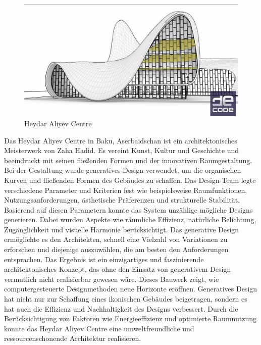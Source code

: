 \begin{figure}[h]
    \begin{minipage}{0.5\textwidth}
      \centering
      \includegraphics[width=\textwidth]{./images/DE_Rh_lvl1_baku.jpg}
    \end{minipage}
    \caption{Heydar Aliyev Centre}
    \label{fig:meinbild}
  \end{figure}

Das Heydar Aliyev Centre in Baku, Aserbaidschan ist ein architektonisches Meisterwerk von Zaha Hadid. Es vereint Kunst, Kultur und Geschichte und beeindruckt mit seinen fließenden Formen und der innovativen Raumgestaltung. 
Bei der Gestaltung wurde generatives Design verwendet, um die organischen Kurven und fließenden Formen des Gebäudes zu schaffen. Das Design-Team legte verschiedene Parameter und Kriterien fest wie beispielsweise Raumfunktionen, Nutzungsanforderungen, ästhetische Präferenzen und strukturelle Stabilität. 
Basierend auf diesen Parametern konnte das System unzählige mögliche Designs generieren. Dabei wurden Aspekte wie räumliche Effizienz, natürliche Belichtung, Zugänglichkeit und visuelle Harmonie berücksichtigt. Das generative Design ermöglichte es den Architekten, schnell eine Vielzahl von Variationen zu erforschen und diejenige auszuwählen, die am besten den Anforderungen entsprachen. 
Das Ergebnis ist ein einzigartiges und faszinierende architektonisches Konzept, das ohne den Einsatz von generativem Design vermutlich nicht realisierbar gewesen wäre. Dieses Bauwerk zeigt, wie computergesteuerte Designmethoden neue Horizonte eröffnen. 
Generatives Design hat nicht nur zur Schaffung eines ikonischen Gebäudes beigetragen, sondern es hat auch die Effizienz und Nachhaltigkeit des Designs verbessert. Durch die Berücksichtigung von Faktoren wie Energieeffizienz und optimierte Raumnutzung konnte das Heydar Aliyev Centre eine umweltfreundliche und ressourcenschonende Architektur realisieren. \autocite*{5}
